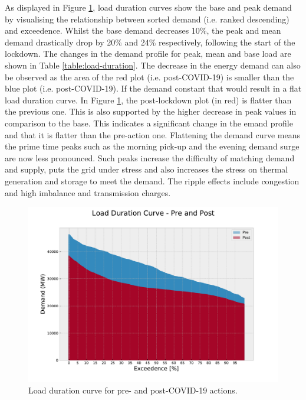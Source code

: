 \documentclass[energies,article,submit,moreauthors,pdftex]{Definitions/mdpi}
\begin{document}
As displayed in Figure \ref{fig:load_duration}, load duration curves show the base and peak demand by visualising the relationship between sorted demand (i.e. ranked descending) and exceedence. Whilst the base demand decreases 10\%, the peak and mean demand drastically drop by 20\% and 24\% respectively, following the start of the lockdown. The changes in the demand profile for peak, mean and base load are shown in Table \ref{table:load-duration}. The decrease in the energy demand can also be observed as the area of the red plot (i.e. post-COVID-19) is smaller than the blue plot (i.e. post-COVID-19). If the demand constant that would result in a flat load duration curve. In Figure \ref{fig:load_duration}, the post-lockdown plot (in red) is flatter than the previous one. This is also supported by the higher decrease in peak values in comparison to the base. This indicates a significant change in the emand profile and that it is flatter than the pre-action one. Flattening the demand curve means the prime time peaks such as the morning pick-up and the evening demand surge are now less pronounced. Such peaks increase the difficulty of matching demand and supply, puts the grid under stress and also increases the stress on thermal generation and storage to meet the demand. The ripple effects include congestion and high imbalance and transmission charges. 

\begin{figure}[H]
\centering
\hspace{-25pt}\includegraphics[width=13 cm]{Graphics/Load_duration_curve.pdf}
\caption{Load duration curve for pre- and post-COVID-19 actions.}\label{fig:load_duration}
\end{figure}  
\end{document}
